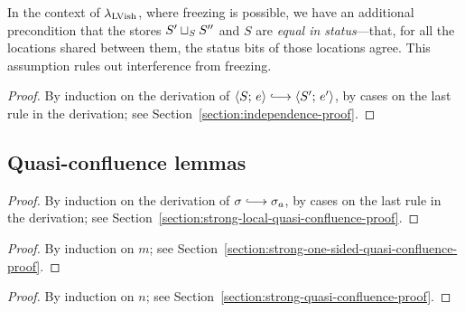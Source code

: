 In the context of $\lambda_{\textrm{LVish}}$, where freezing is possible, we have
an additional precondition that the stores $S' \sqcup_{S} S''$ and
$S$ are \emph{equal in status}---that, for all the locations shared
between them, the status bits of those locations agree.  This
assumption rules out interference from freezing.

\DefEqualStatus

\LemIndependence
\begin{proof}
   By induction on the derivation of $\config{S}{e} \parstepsto
   \config{S'}{e'}$, by cases on the last rule in the derivation; see
   Section~\ref{section:independence-proof}.
\end{proof}

\subsection{Quasi-confluence lemmas}\label{subsection:quasi-quasi-confluence}



\LemStrongLocalQuasiConfluence
\begin{proof}
  By induction on the derivation of $\conf \parstepsto \conf_a$, by
  cases on the last rule in the derivation; see
  Section~\ref{section:strong-local-quasi-confluence-proof}.
\end{proof}

\LemStrongOneSidedQuasiConfluence
\begin{proof}
  By induction on $m$; see
  Section~\ref{section:strong-one-sided-quasi-confluence-proof}.
\end{proof}

\LemStrongQuasiConfluence
\begin{proof}
  By induction on $n$; see
  Section~\ref{section:strong-quasi-confluence-proof}.
\end{proof}

